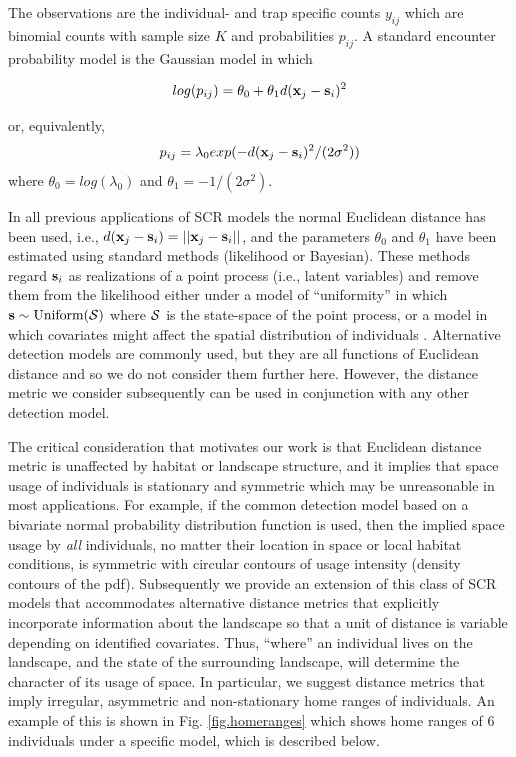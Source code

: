 \documentclass[12pt]{article}
\begin{document}
The observations are the individual- and trap specific counts $y_{ij}$
which are binomial counts with sample size $K$ and probabilities
$p_{ij}$. A standard encounter probability model
\citep{borchers_efford:2008} is the Gaussian model in which

\begin{equation}
log(p_{ij})= \theta_{0} + \theta_{1} d({\bf x}_{j} - {\bf s}_{i})^{2}
\label{eq.encounter}
\end{equation}

{\flushleft or, equivalently, }
\[
p_{ij} = \lambda_{0} exp(-  d({\bf x}_{j} - {\bf s}_{i})^{2}
/(2\sigma^{2}) )
\]
where $\theta_{0} = log(\lambda_{0})$ and $\theta_{1} =
-1/(2\sigma^2)$.

In all previous applications of SCR models the normal Euclidean
distance has been used, i.e., $ d({\bf x}_{j} - {\bf s}_{i}) =
||{\bf x}_{j} - {\bf s}_{i}||$, and the parameters $\theta_0$ and
$\theta_1$ have been estimated using standard methods (likelihood or
Bayesian). These methods regard ${\bf s}_{i}$ as realizations of a
point process (i.e., latent variables) and remove them from the
likelihood either under a model of ``uniformity'' in which ${\bf s}
\sim \mbox{Uniform}({\cal S})$ where ${\cal S}$ is the state-space of
the point process, or a model in which covariates might affect the spatial
distribution of individuals \citep{borchers_efford:2008}. Alternative detection
models are commonly used, but they are all functions of Euclidean
distance and so we do not consider them further here. However, the
distance metric we consider subsequently can be used in conjunction
with any other detection model.

The critical consideration that motivates our work is that
 Euclidean distance metric is unaffected by habitat or landscape
structure, and it implies that space usage of individuals is
stationary and symmetric which may be unreasonable in most
applications.  For example, if the common detection model based on a
bivariate
normal probability distribution function is used, then the implied
space
usage by {\it all} individuals, no matter their location in space or
local habitat conditions, is symmetric with circular contours of
usage intensity (density contours of the pdf).
Subsequently we provide an extension of this class of SCR models that
accommodates alternative distance metrics that explicitly incorporate
information about the landscape so that a unit of distance is variable
depending on identified covariates. Thus, ``where'' an individual
lives on the landscape, and the state of the surrounding landscape,
will determine the character of its usage of space. In particular, we
suggest distance metrics that imply irregular, asymmetric and
non-stationary home ranges of individuals. An example of this is shown
in Fig. \ref{fig.homeranges} which shows home ranges of 6 individuals under
a specific model, which is described below.
\end{document}
